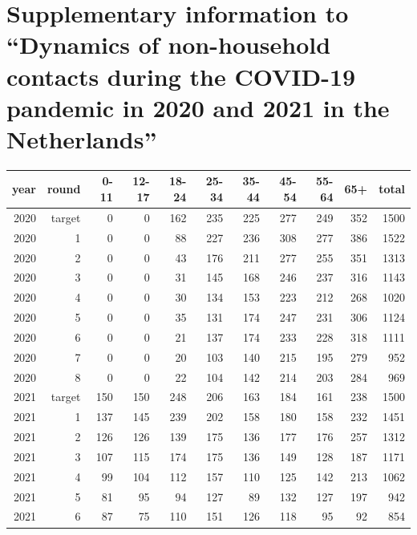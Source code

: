 \documentclass[fleqn,10pt]{wlscirep}
\begin{document}
\section*{Supplementary information to ``Dynamics of non-household contacts during the COVID-19 pandemic in 2020 and 2021 in the Netherlands''}


\renewcommand{\thefigure}{S\arabic{figure}}
\setcounter{figure}{0}
\renewcommand{\thetable}{S\arabic{table}}
\setcounter{table}{0}


\begin{table}[ht]
\centering
\begin{tabular}{rrrrrrrrrrr}
  \hline
year & round & 0-11 & 12-17 & 18-24 & 25-34 & 35-44 & 45-54 & 55-64 & 65+ & total \\ 
  \hline
  2020 &  target &   0 &   0 & 162 & 235 & 225 & 277 & 249 & 352 & 1500 \\ 
  2020 &   1 &   0 &   0 &  88 & 227 & 236 & 308 & 277 & 386 & 1522 \\ 
  2020 &   2 &   0 &   0 &  43 & 176 & 211 & 277 & 255 & 351 & 1313 \\ 
  2020 &   3 &   0 &   0 &  31 & 145 & 168 & 246 & 237 & 316 & 1143 \\ 
  2020 &   4 &   0 &   0 &  30 & 134 & 153 & 223 & 212 & 268 & 1020 \\ 
  2020 &   5 &   0 &   0 &  35 & 131 & 174 & 247 & 231 & 306 & 1124 \\ 
  2020 &   6 &   0 &   0 &  21 & 137 & 174 & 233 & 228 & 318 & 1111 \\ 
  2020 &   7 &   0 &   0 &  20 & 103 & 140 & 215 & 195 & 279 & 952 \\ 
  2020 &   8 &   0 &   0 &  22 & 104 & 142 & 214 & 203 & 284 & 969 \\ 
  \hline
  2021 &   target & 150 & 150 & 248 & 206 & 163 & 184 & 161 & 238 & 1500 \\ 
  2021 &   1 & 137 & 145 & 239 & 202 & 158 & 180 & 158 & 232 & 1451 \\ 
  2021 &   2 & 126 & 126 & 139 & 175 & 136 & 177 & 176 & 257 & 1312 \\ 
  2021 &   3 & 107 & 115 & 174 & 175 & 136 & 149 & 128 & 187 & 1171 \\ 
  2021 &   4 &  99 & 104 & 112 & 157 & 110 & 125 & 142 & 213 & 1062 \\ 
  2021 &   5 &  81 &  95 &  94 & 127 &  89 & 132 & 127 & 197 & 942 \\ 
  2021 &   6 &  87 &  75 & 110 & 151 & 126 & 118 &  95 &  92 & 854 \\ 

\end{tabular}
\end{table}
\end{document}
